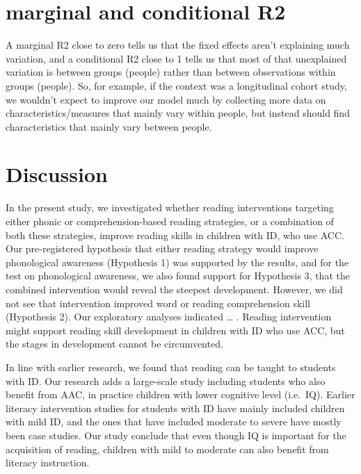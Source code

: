 \documentclass[
  ,
]{article}
\begin{document}
\hypertarget{marginal-and-conditional-r2}{%
\section{marginal and conditional
R2}\label{marginal-and-conditional-r2}}

A marginal R2 close to zero tells us that the fixed effects aren't
explaining much variation, and a conditional R2 close to 1 tells us that
most of that unexplained variation is between groups (people) rather
than between observations within groups (people). So, for example, if
the context was a longitudinal cohort study, we wouldn't expect to
improve our model much by collecting more data on
characteristics/measures that mainly vary within people, but instead
should find characteristics that mainly vary between people.

\hypertarget{discussion}{%
\section{Discussion}\label{discussion}}

In the present study, we investigated whether reading interventions
targeting either phonic or comprehension-based reading strategies, or a
combination of both these strategies, improve reading skills in children
with ID, who use ACC. Our pre-registered hypothesis that either reading
strategy would improve phonological awareness (Hypothesis 1) was
supported by the results, and for the test on phonological awareness, we
also found support for Hypothesis 3, that the combined intervention
would reveal the steepest development. However, we did not see that
intervention improved word or reading comprehension skill (Hypothesis
2). Our exploratory analyses indicated \ldots{} . Reading intervention
might support reading skill development in children with ID who use ACC,
but the stages in development cannot be circumvented.

In line with earlier research, we found that reading can be taught to
students with ID. Our research adds a large-scale study including
students who also benefit from AAC, in practice children with lower
cognitive level (i.e.~IQ). Earlier literacy intervention studies for
students with ID have mainly included children with mild ID, and the
ones that have included moderate to severe have mostly been case
studies. Our study conclude that even though IQ is important for the
acquisition of reading, children with mild to moderate can also benefit
from literacy instruction.
\end{document}
